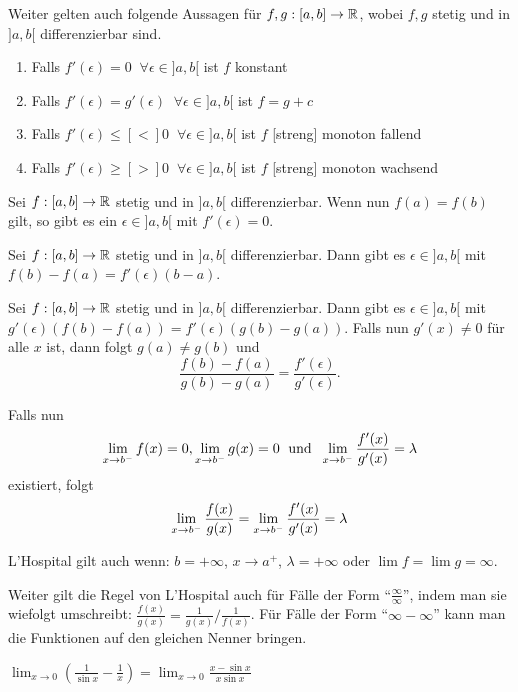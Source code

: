 Weiter gelten auch folgende Aussagen für $f,g : [a,b] \to \mathbb{R}$, wobei $f,g$ stetig und in $]a,b[$
differenzierbar sind.
\begin{enumerate}[label = (\arabic*)]
    \item Falls $f'(\epsilon) = 0 \; \; \forall \epsilon \in ]a,b[$ ist $f$ konstant
    \item Falls $f'(\epsilon) = g'(\epsilon) \; \; \forall \epsilon \in ]a,b[$ ist $f = g + c$
    \item Falls $f'(\epsilon) \leq [<] 0 \; \; \forall \epsilon \in ]a,b[$ ist $f$ [streng] monoton fallend
    \item Falls $f'(\epsilon) \geq [>] 0 \; \; \forall \epsilon \in ]a,b[$ ist $f$ [streng] monoton wachsend
\end{enumerate}



\Satz Sei $f : [a,b] \to \mathbb{R}$ stetig und in $]a,b[$ differenzierbar. Wenn nun $f(a) = f(b)$ gilt, so 
gibt es ein $\epsilon \in ]a,b[$ mit $f'(\epsilon) = 0$.



\Satz Sei $f : [a,b] \to \mathbb{R}$ stetig und in $]a,b[$ differenzierbar. Dann gibt es $\epsilon \in ]a,b[$ 
mit $f(b) - f(a) = f'(\epsilon)(b - a)$.



Sei $f : [a,b] \to \mathbb{R}$ stetig und in $]a,b[$ differenzierbar. Dann gibt es $\epsilon \in ]a,b[$ mit
$g'(\epsilon)(f(b)-f(a)) = f'(\epsilon)(g(b)-g(a))$. Falls nun $g'(x) \neq 0$ für alle $x$ ist, dann
folgt $g(a) \neq g(b)$ und 
$$\frac{f(b) - f(a)}{g(b) - g(a)} = \frac{f'(\epsilon)}{g'(\epsilon)}.$$

\Satz Falls nun 
$$\lim\limits_{x \to b^-} f(x) = 0, \lim\limits_{x \to b^-} g(x) = 0 \; \text{ und } \; \lim\limits_{x \to b^-} \frac{f'(x)}{g'(x)} = \lambda$$
existiert, folgt 
$$\lim\limits_{x \to b^-} \frac{f(x)}{g(x)} = \lim\limits_{x \to b^-} \frac{f'(x)}{g'(x)} = \lambda $$ 

L'Hospital gilt auch wenn: $b = +\infty$, $x \to a^+$, $\lambda = +\infty$ oder 
$\lim f = \lim g = \infty$.

Weiter gilt die Regel von L'Hospital auch für Fälle der Form ``$\frac{\infty}{\infty}$'', indem man
sie wiefolgt umschreibt: $\frac{f(x)}{g(x)}=\frac 1{g(x)} / \frac 1{f(x)}$.
Für Fälle der Form ``$\infty-\infty$'' kann man die Funktionen auf den gleichen Nenner bringen.

\Bsp $\lim_{x \to 0}\left(\frac1{\sin x}-\frac1x\right)=\lim_{x \to 0}\frac{x-\sin x}{x\sin x}$


